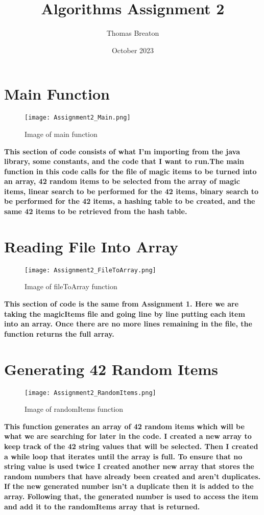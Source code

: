 \documentclass{article}
\title{Algorithms Assignment 2}
\author{Thomas Breaton}
\date{October 2023}
\begin{document}
\maketitle

\section{Main Function}
\begin{figure}[h]
    \centering
    \texttt{[image: Assignment2\_Main.png]}
    \caption{Image of main function}
    \label{fig:mainFunction}
\end{figure}
\textbf{This section of code consists of what I'm importing from the java library, some constants, and the code that I want to run.The main function in this code calls for the file of magic items to be turned into an array, 42 random items to be selected from the array of magic items, linear search to be performed for the 42 items, binary search to be performed for the 42 items, a hashing table to be created, and the same 42 items to be retrieved from the hash table.}
\newpage

\section{Reading File Into Array}
\begin{figure}[h]
    \centering
    \texttt{[image: Assignment2\_FileToArray.png]}
    \caption{Image of fileToArray function}
    \label{fig:fileToArray}
\end{figure}
\textbf{This section of code is the same from Assignment 1. Here we are taking the magicItems file and going line by line putting each item into an array. Once there are no more lines remaining in the file, the function returns the full array.}
\newpage

\section{Generating 42 Random Items}
\begin{figure}[h]
    \centering
    \texttt{[image: Assignment2\_RandomItems.png]}
    \caption{Image of randomItems function}
    \label{fig:randomItems}
\end{figure}
\textbf{This function generates an array of 42 random items which will be what we are searching for later in the code. I created a new array to keep track of the 42 string values that will be selected. Then I created a while loop that iterates until the array is full. To ensure that no string value is used twice I created another new array that stores the random numbers that have already been created and aren't duplicates. If the new generated number isn't a duplicate then it is added to the array. Following that, the generated number is used to access the item and add it to the randomItems array that is returned.}
\newpage
\end{document}
